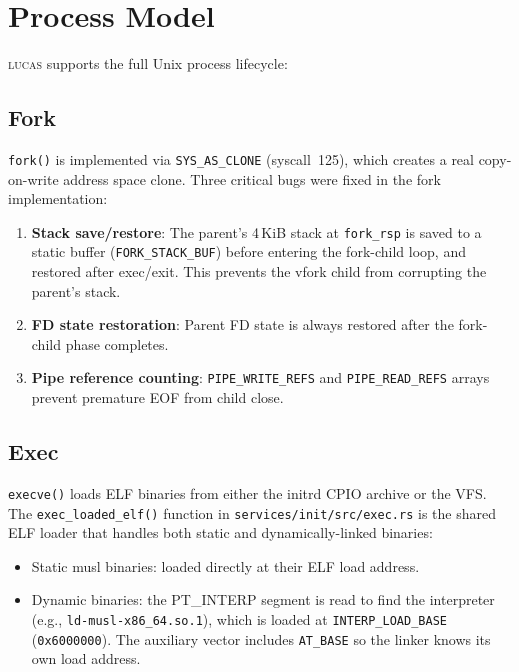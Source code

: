 \documentclass[11pt,a4paper,twoside]{report}
\theoremstyle{definition}
\newcommand{\LUCAS}{\textsc{lucas}}
\newcommand{\syscall}[1]{\texttt{#1}}
\newcommand{\hex}[1]{\texttt{0x#1}}
\newcommand{\file}[1]{\texttt{#1}}
\begin{document}
\section{Process Model}

\LUCAS{} supports the full Unix process lifecycle:

\subsection{Fork}

\texttt{fork()} is implemented via \syscall{SYS\_AS\_CLONE} (syscall~125),
which creates a real copy-on-write address space clone. Three critical bugs
were fixed in the fork implementation:

\begin{enumerate}[leftmargin=1.4em]
  \item \textbf{Stack save/restore}: The parent's 4\,KiB stack at
    \texttt{fork\_rsp} is saved to a static buffer (\texttt{FORK\_STACK\_BUF})
    before entering the fork-child loop, and restored after exec/exit. This
    prevents the vfork child from corrupting the parent's stack.
  \item \textbf{FD state restoration}: Parent FD state is always restored
    after the fork-child phase completes.
  \item \textbf{Pipe reference counting}: \texttt{PIPE\_WRITE\_REFS} and
    \texttt{PIPE\_READ\_REFS} arrays prevent premature EOF from child close.
\end{enumerate}

\subsection{Exec}

\texttt{execve()} loads ELF binaries from either the initrd CPIO archive or
the VFS. The \texttt{exec\_loaded\_elf()} function in \file{services/init/src/exec.rs}
is the shared ELF loader that handles both static and dynamically-linked
binaries:

\begin{itemize}[leftmargin=1.4em]
  \item Static musl binaries: loaded directly at their ELF load address.
  \item Dynamic binaries: the PT\_INTERP segment is read to find the
    interpreter (e.g., \texttt{ld-musl-x86\_64.so.1}), which is loaded at
    \texttt{INTERP\_LOAD\_BASE} (\hex{6000000}). The auxiliary vector
    includes \texttt{AT\_BASE} so the linker knows its own load address.
\end{itemize}
\end{document}
